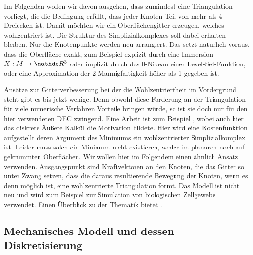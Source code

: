 \begin{ziel}
    Im Folgenden wollen wir davon ausgehen, dass zumindest eine Triangulation vorliegt, die die Bedingung erfüllt, dass jeder Knoten Teil von mehr als 4 Dreiecken ist. 
    Damit möchten wir ein Oberflächengitter erzeugen, welches wohlzentriert ist.
    Die Struktur des Simplizialkomplexes soll dabei erhalten bleiben. Nur die Knotenpunkte werden neu arrangiert. Das setzt natürlich voraus, dass die Oberfläche exakt, 
    zum Beispiel explizit durch eine Immersion \( X: M \rightarrow \R^{3} \) oder implizit durch das 0-Niveau einer Level-Set-Funktion\cite{levelset}, oder eine Approximation der 2-Mannigfaltigkeit höher als 1 gegeben ist.

    Ansätze zur Gitterverbesserung bei der die Wohlzentriertheit im Vordergrund steht gibt es bis jetzt wenige.
    Denn obwohl diese Forderung an der Triangulation für viele numerische Verfahren Vorteile bringen würde, 
    so ist sie doch nur für den hier verwendeten DEC zwingend. 
    Eine Arbeit ist zum Beispiel \cite{meshHirani}, wobei auch hier das diskrete Äußere Kalkül die Motivation bildete.
    Hier wird eine Kostenfunktion aufgestellt deren Argument des Minimums ein wohlzentrierter Simplizialkomplex ist.
    Leider muss solch ein Minimum nicht existieren, weder im planaren noch auf gekrümmten Oberflächen.
    Wir wollen hier im Folgendem einen ähnlich Ansatz verwenden. 
    Ausgangspunkt sind Kraftvektoren an den Knoten, die das Gitter so unter Zwang setzen, dass die daraus resultierende Bewegung der
    Knoten, wenn es denn möglich ist, eine wohlzentrierte Triangulation formt. 
    Das Modell ist nicht neu und wird zum Beispiel zur Simulation von biologischen Zellgewebe verwendet. 
    Einen Überblick zu der Thematik bietet \cite{meshCooper}.  
  \end{ziel}

  
  
  \subsection{Mechanisches Modell und dessen Diskretisierung}
    
